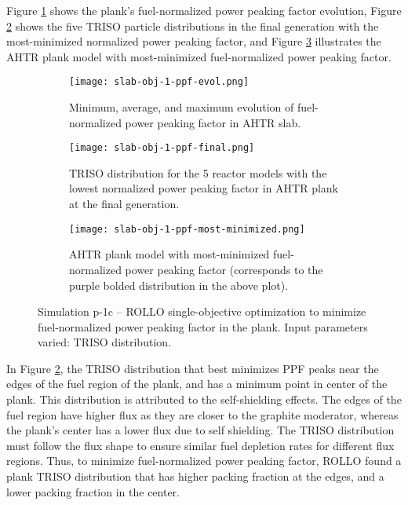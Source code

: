 Figure \ref{fig:slab-obj-1-ppf-evol} shows the plank's fuel-normalized power peaking 
factor evolution, Figure \ref{fig:slab-obj-1-ppf-final} shows the five TRISO particle 
distributions in the final generation with the most-minimized normalized power peaking 
factor, and Figure \ref{fig:slab-obj-1-ppf-most-minimized} illustrates the \gls{AHTR} 
plank model with most-minimized fuel-normalized power peaking factor. 
\begin{figure}[htbp!]
    \centering
    \begin{subfigure}{0.9\textwidth}
        \texttt{[image: slab-obj-1-ppf-evol.png]}
        \caption{Minimum, average, and maximum evolution of fuel-normalized power 
        peaking factor in AHTR slab.}
        \label{fig:slab-obj-1-ppf-evol} 
    \end{subfigure}
    \begin{subfigure}{0.9\textwidth}
        \texttt{[image: slab-obj-1-ppf-final.png]}
        \caption{TRISO distribution for the 5 reactor models with the 
        lowest normalized power peaking factor in AHTR plank at the final generation.}
        \label{fig:slab-obj-1-ppf-final} 
    \end{subfigure}
    \begin{subfigure}{0.9\textwidth}
        \texttt{[image: slab-obj-1-ppf-most-minimized.png]}
        \caption{\gls{AHTR} plank model with most-minimized fuel-normalized power 
        peaking factor
        (corresponds to the purple bolded distribution in the above plot).}
        \label{fig:slab-obj-1-ppf-most-minimized} 
    \end{subfigure}
    \caption{Simulation p-1c -- ROLLO single-objective optimization to minimize 
    fuel-normalized power peaking factor in the plank. 
    Input parameters varied: TRISO distribution.}
    \label{fig:slab-obj-1-ppf}
\end{figure}

In Figure \ref{fig:slab-obj-1-ppf-final}, the TRISO distribution that best minimizes 
PPF peaks near the edges of the fuel region of the plank, and has a minimum point in 
center of the plank.
This distribution is attributed to the self-shielding effects. 
The edges of the fuel region have higher flux as they are closer to the graphite 
moderator, whereas the plank's center has a lower flux due to self shielding. 
The TRISO distribution must follow the flux shape to ensure similar fuel depletion 
rates for different flux regions. 
Thus, to minimize fuel-normalized power peaking factor, \gls{ROLLO} found a plank 
\gls{TRISO} distribution that has higher packing fraction at the edges, and a 
lower packing fraction in the center. 

